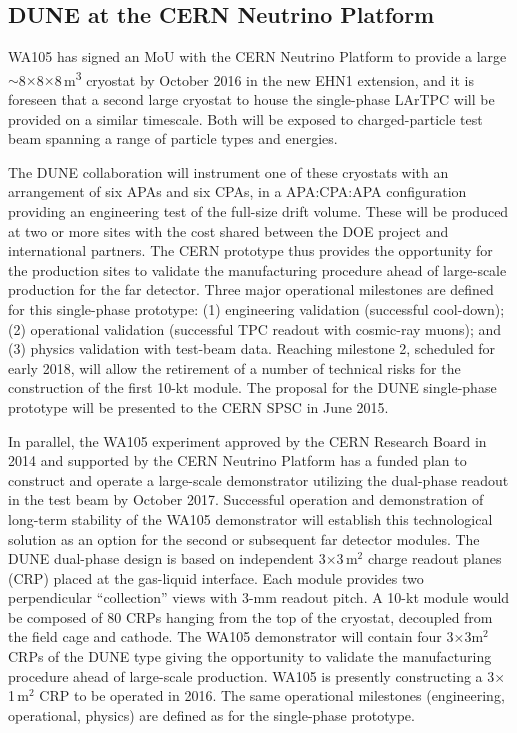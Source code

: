 \subsection{DUNE at the CERN Neutrino Platform}
\label{v1ch3:dune-at-cern}

WA105 has signed an MoU with the CERN Neutrino Platform to provide a large 
$\sim$8$\times$8$\times$8\,m\textsuperscript{3} cryostat by October 2016 in the new EHN1 extension, 
and it is foreseen that a second large cryostat to house the single-phase LArTPC will 
be provided on a similar timescale. Both will be exposed to charged-particle test 
beam spanning a range of particle types and energies.   

The DUNE collaboration will instrument one of these cryostats with an arrangement 
of six APAs and six CPAs, in a APA:CPA:APA configuration providing an engineering 
test of the full-size drift volume. These will be produced at two or more sites with the cost 
shared between the DOE project and international partners. The CERN prototype thus 
provides the opportunity for the production sites to validate the manufacturing 
procedure ahead of large-scale production for the far detector. Three major operational 
milestones are defined for this single-phase prototype: (1) engineering validation 
(successful cool-down); (2) operational validation (successful TPC readout with 
cosmic-ray muons); and (3) physics validation with test-beam data. Reaching milestone 
2, scheduled for early 2018, will allow the retirement of a number of technical 
risks for the construction of the first 10-kt module. The proposal for the DUNE 
single-phase prototype will be presented to the CERN SPSC in June 2015. 

In parallel, the WA105 experiment approved by the CERN Research Board in 2014 and supported 
by the CERN Neutrino Platform has a funded plan to construct and operate a large-scale 
demonstrator utilizing the dual-phase readout in the test beam by October 2017. 
Successful operation and demonstration of long-term stability of the WA105 demonstrator 
will establish this technological solution as an option for the second or subsequent 
far detector modules. The DUNE dual-phase design is based on independent 3$\times$3\,m$^2$
charge readout planes (CRP) placed at the gas-liquid interface. Each module provides 
two perpendicular ``collection'' views with 3-mm readout pitch. A 10-kt module 
would be composed of 80 CRPs hanging from the top of the cryostat, decoupled from 
the field cage and cathode. The WA105 demonstrator will contain four 3$\times$3m$^2$ 
CRPs of the DUNE type giving the opportunity to validate the manufacturing procedure 
ahead of large-scale production. WA105 is presently constructing a 3$\times$1\,m$^2$ 
CRP to be operated in 2016. The same operational milestones (engineering, operational, 
physics) are defined as for the single-phase prototype.

